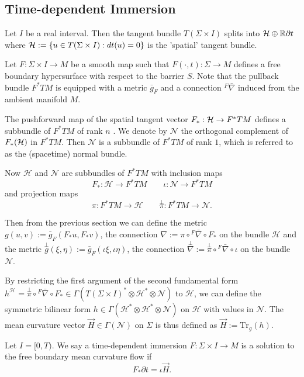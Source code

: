\subsection{Time-dependent Immersion}
Let $I$ be a real interval. Then the tangent bundle $T(\Sigma \times I)$ splits into $\mathcal{H} \oplus \mathbb{R} \partial t$ where $\mathcal{H} := \left\{ u \in T(\Sigma \times I) : dt(u)=0\right\} $  is the 'spatial' tangent bundle.

Let $F: \Sigma \times I \to M$ be a smooth map such that $F(\cdot,t) : \Sigma \to M $ defines a free boundary hypersurface with respect to the barrier $S$. Note that the pullback bundle $F^*TM$ is equipped with a metric $\bar{g}_F$ and a connection ${}^F \bar{\nabla }$ induced from the ambient manifold $M$. 

The pushforward map of the spatial tangent vector $F_* : \mathcal{H} \to F^*TM $ defines a subbundle of $F^*TM$ of rank $n$ . We denote by $\mathcal{N} $ the orthogonal complement of $F_*(\mathcal{H})$ in $F^*TM$. Then $\mathcal{N} $ is a subbundle of $F^*TM $ of rank $1$, which is referred to as the (spacetime) normal bundle.

Now $\mathcal{H} $ and $\mathcal{N} $ are subbundles of $F^*TM $ with inclusion maps
\[F_*: \mathcal{H} \to F^*TM \qquad \iota : \mathcal{N} \to F^*TM \]
and projection maps
\[\pi : F^*TM \to \mathcal{H} \qquad \overset{\perp }{\pi} : F^*TM \to \mathcal{N} .\]

Then from the previous section we can define the metric $g(u,v):=\bar{g}_F(F_* u, F_* v)$, the connection $\nabla := \pi \circ {}^F \bar{\nabla } \circ F_*$ on the bundle $\mathcal{H} $ and the metric $\overset{\perp }{g} (\xi , \eta ):=\bar{g}_F(\iota \xi , \iota \eta )$, the connection $\overset{\perp }{\nabla} := \overset{\perp }{\pi} \circ {}^F \bar{\nabla } \circ \iota $ on the bundle $\mathcal{N} $.

By restricting the first argument of the second fundamental form $h^{\mathcal{H} }=\overset{\perp }{\pi} \circ {}^F \bar{\nabla } \circ F_* \in \Gamma (T(\Sigma \times I)^* \otimes \mathcal{H} ^* \otimes \mathcal{N} )$ to $\mathcal{H} $, we can define the symmetric bilinear form $h \in \Gamma (\mathcal{H} ^* \otimes \mathcal{H} ^* \otimes \mathcal{N})$ on $\mathcal{H} $ with values in $\mathcal{N} $. The mean curvature vector $\vec{H} \in \Gamma (\mathcal{N} )$ on $\Sigma $ is thus defined as $\vec{H} := \mathrm{Tr}_g(h)$.

Let $I=[0,T)$. We say a time-dependent immersion $F: \Sigma \times I \to M$ is a solution to the free boundary mean curvature flow if \[F_* \partial t = \iota \vec{H}.\]

